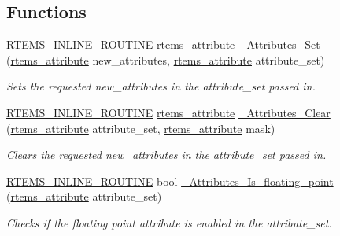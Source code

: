 \subsection*{Functions}
\begin{DoxyCompactItemize}
\item 
\mbox{\hyperlink{group__RTEMSScoreBaseDefs_gac216239df231d5dbd15e3520b0b9313f}{R\+T\+E\+M\+S\+\_\+\+I\+N\+L\+I\+N\+E\+\_\+\+R\+O\+U\+T\+I\+NE}} \mbox{\hyperlink{group__ClassicAttributes_gaea40313cf78ed843e09c4315d0a10f79}{rtems\+\_\+attribute}} \mbox{\hyperlink{group__ClassicAttributesImpl_ga9b9fd8795f6a98817dc0b3dc96b5c770}{\+\_\+\+Attributes\+\_\+\+Set}} (\mbox{\hyperlink{group__ClassicAttributes_gaea40313cf78ed843e09c4315d0a10f79}{rtems\+\_\+attribute}} new\+\_\+attributes, \mbox{\hyperlink{group__ClassicAttributes_gaea40313cf78ed843e09c4315d0a10f79}{rtems\+\_\+attribute}} attribute\+\_\+set)
\begin{DoxyCompactList}\small\item\em Sets the requested new\+\_\+attributes in the attribute\+\_\+set passed in. \end{DoxyCompactList}\item 
\mbox{\hyperlink{group__RTEMSScoreBaseDefs_gac216239df231d5dbd15e3520b0b9313f}{R\+T\+E\+M\+S\+\_\+\+I\+N\+L\+I\+N\+E\+\_\+\+R\+O\+U\+T\+I\+NE}} \mbox{\hyperlink{group__ClassicAttributes_gaea40313cf78ed843e09c4315d0a10f79}{rtems\+\_\+attribute}} \mbox{\hyperlink{group__ClassicAttributesImpl_gae96795baaff6c74b42a9dafd286b93f7}{\+\_\+\+Attributes\+\_\+\+Clear}} (\mbox{\hyperlink{group__ClassicAttributes_gaea40313cf78ed843e09c4315d0a10f79}{rtems\+\_\+attribute}} attribute\+\_\+set, \mbox{\hyperlink{group__ClassicAttributes_gaea40313cf78ed843e09c4315d0a10f79}{rtems\+\_\+attribute}} mask)
\begin{DoxyCompactList}\small\item\em Clears the requested new\+\_\+attributes in the attribute\+\_\+set passed in. \end{DoxyCompactList}\item 
\mbox{\hyperlink{group__RTEMSScoreBaseDefs_gac216239df231d5dbd15e3520b0b9313f}{R\+T\+E\+M\+S\+\_\+\+I\+N\+L\+I\+N\+E\+\_\+\+R\+O\+U\+T\+I\+NE}} bool \mbox{\hyperlink{group__ClassicAttributesImpl_ga0dfdabdcfadce52be0fd8ca48831c234}{\+\_\+\+Attributes\+\_\+\+Is\+\_\+floating\+\_\+point}} (\mbox{\hyperlink{group__ClassicAttributes_gaea40313cf78ed843e09c4315d0a10f79}{rtems\+\_\+attribute}} attribute\+\_\+set)
\begin{DoxyCompactList}\small\item\em Checks if the floating point attribute is enabled in the attribute\+\_\+set. \end{DoxyCompactList}\item 

\end{DoxyCompactItemize}
